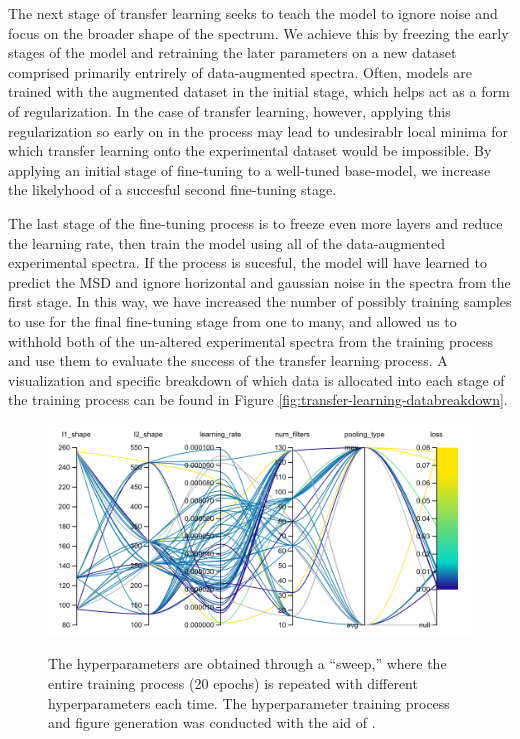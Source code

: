 The next stage of transfer learning seeks to teach the model to ignore noise and focus on the broader shape of the spectrum. We achieve this by freezing the early stages of the model and retraining the later parameters on a new dataset comprised primarily entrirely of data-augmented spectra. Often, models are trained with the augmented dataset in the initial stage, which helps act as a form of regularization. In the case of transfer learning, however, applying this regularization so early on in the process may lead to undesirablr local minima for which transfer learning onto the experimental dataset would be impossible. By applying an initial stage of fine-tuning to a well-tuned base-model, we increase the likelyhood of a succesful second fine-tuning stage.

The last stage of the fine-tuning process is to freeze even more layers and reduce the learning rate, then train the model using all of the data-augmented experimental spectra. If the process is sucesful, the model will have learned to predict the MSD and ignore horizontal and gaussian noise in the spectra from the first stage. In this way, we have increased the number of possibly training samples to use for the final fine-tuning stage from one to many, and allowed us to withhold both of the un-altered experimental spectra from the training process and use them to evaluate the success of the transfer learning process. A visualization and specific breakdown of which data is allocated into each stage of the training process can be found in Figure \ref{fig:transfer-learning-databreakdown}.

\begin{figure}
    \centering
    \includegraphics[width=\linewidth]{Chapters/Figures/new-hyperparameter-sweep-meta-1.png}
    \label{fig:meta-1-sweep-params}
    \caption[Hyperpamater Sweep 1]{The hyperparameters are obtained through a ``sweep,'' where the entire training process (20 epochs) is repeated with different hyperparameters each time. The hyperparameter training process and figure generation was conducted with the aid of \cite{wandb}.}
\end{figure}





